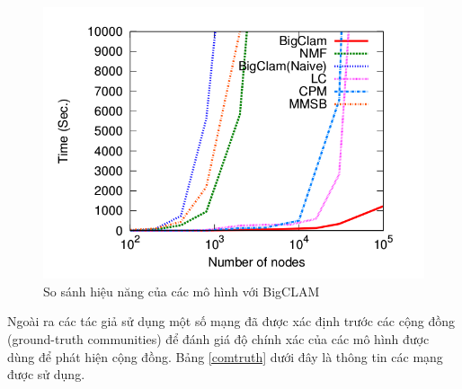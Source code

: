 \begin{figure}[H]
	\centering
	\includegraphics[width=0.6\linewidth]{Chapter3/Chapter3Figs/bigclamcomparis}
	\caption{So sánh hiệu năng của các mô hình với BigCLAM}
	\label{fig:bigclamcomparis}
\end{figure}

Ngoài ra các tác giả sử dụng một số mạng đã được xác định trước các cộng đồng (ground-truth communities) để đánh giá độ chính xác của các mô hình được dùng để phát hiện cộng đồng. Bảng \ref{comtruth} dưới đây là thông tin các mạng được sử dụng.

